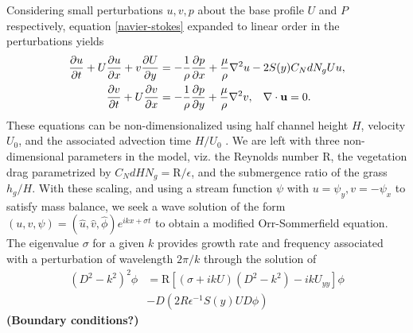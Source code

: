 \documentclass[aps,prl,twocolumn,showpacs,superscriptaddress,groupedaddress,10pt]{revtex4-1}  %
\newcommand{\bu}{\mathbf{u}}
\newcommand{\del}{\partial}
\newcommand{\Rey}{\text{R}}
\newcommand{\shreyas}[1]{{\bf (#1)}}
\begin{document}
Considering small perturbations $u, v, p$ about the base profile $U$ and $P$ respectively, equation \eqref{navier-stokes} expanded to linear order in the perturbations yields
\begin{equation}
\begin{split}
\frac{\del u}{\del t}+U\frac{\del u}{\del x}+v\frac{\del U}{\del y} &= -\frac{1}{\rho}\frac{\del p}{\del x}+\frac{\mu}{\rho}\nabla^2u-2S(y) C_{N}dN_{g}Uu, \\
\frac{\del v}{\del  t}+ U\frac{\del v}{\del x} &= -\frac{1}{\rho}\frac{\del p}{\del y}+\frac{\mu}{\rho}\nabla^2v, \hspace{0.3cm} \nabla\cdot\bu=0.
\end{split}
\end{equation}
These equations can be non-dimensionalized using half channel height $H$, velocity $U_0$, and the associated advection time $H/U_0$ . 
We are left with three non-dimensional parameters in the model, viz. the Reynolds number $\Rey$, the vegetation drag parametrized by $C_N d H N_g = \Rey/\epsilon$, 
and the submergence ratio of the grass $h_g/H$. With these scaling, and using a stream function $\psi$ with $u = \psi_{y}, v= -\psi_x$ to satisfy mass balance, we seek a wave solution of the form $\left(u,v,\psi \right)= \left(\hat u, \hat v, \hat\phi \right)e^{ikx+\sigma t}$ to  obtain a modified Orr-Sommerfield equation. The eigenvalue $\sigma$ for a given $k$ provides growth rate and frequency associated with a perturbation of wavelength $2\pi/k$ through the solution of
\begin{equation}
\begin{split}
\left(D^2 -k^{2} \right)^2\phi &= \Rey \left[ \left({\sigma}+ikU\right) \left(D^2-k^2\right) -ikU_{yy}\right]\phi \\
&-D\left(2R \epsilon^{-1} S(y) U D \phi\right)
\label{Orr-somerfield}
\end{split}
\end{equation}
\shreyas{Boundary conditions?}
\end{document}
